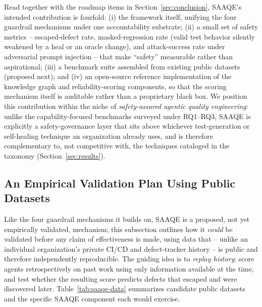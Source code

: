 Read together with the roadmap items in Section~\ref{sec:conclusion}, SAAQE's intended
contribution is fourfold: (i) the framework itself, unifying the four
guardrail mechanisms under one accountability substrate; (ii) a small
set of safety metrics -- escaped-defect rate, masked-regression rate
(valid test behavior silently weakened by a heal or an oracle change),
and attack-success rate under adversarial prompt injection -- that
make ``safety'' measurable rather than aspirational; (iii) a
benchmark suite assembled from existing public datasets (proposed
next); and (iv) an open-source reference implementation of the
knowledge graph and reliability-scoring components, so that the
scoring mechanism itself is auditable rather than a proprietary black
box. We position this contribution within the niche of
\emph{safety-assured agentic quality engineering}: unlike the
capability-focused benchmarks surveyed under RQ1--RQ3, SAAQE is
explicitly a safety-governance layer that sits above whichever
test-generation or self-healing technique an organization already
uses, and is therefore complementary to, not competitive with, the
techniques cataloged in the taxonomy (Section~\ref{sec:results}).

\subsection{An Empirical Validation Plan Using Public Datasets}
\label{sec:saaqe-validation}
Like the four guardrail mechanisms it builds on, SAAQE is a proposed,
not yet empirically validated, mechanism; this subsection outlines how
it \emph{could} be validated before any claim of effectiveness is
made, using data that -- unlike an individual organization's private
CI/CD and defect-tracker history -- is public and therefore
independently reproducible. The guiding idea is to \emph{replay
history}: score agents retrospectively on past work using only
information available at the time, and test whether the resulting
score predicts defects that escaped and were discovered later.
Table~\ref{tab:saaqe-data} summarizes candidate public datasets and
the specific SAAQE component each would exercise.

